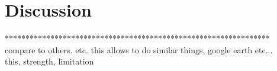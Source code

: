 \label{chapter-discussion}
\chapter{Discussion}

****************************************************************\\%
compare to others. etc. this allows to do similar things, google earth etc...\\
this, strength, limitation

